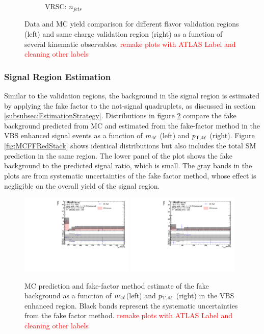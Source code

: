 \begin{figure}[htb]
\begin{subfigure}{.48\textwidth}
        \caption{VRSC: $n_{jets}$}
    \end{subfigure}
        \caption{ Data and MC yield comparison for different flavor validation regions (left) and same charge validation region (right) as a function of several kinematic observables. \textcolor{red}{remake plots with ATLAS Label and cleaning other labels} \label{fig:AllDataMCYield}}
\end{figure}

\subsubsection{Signal Region Estimation}
\label{subsubsec:SREstimation}
Similar to the validation regions, the background in the signal region is estimated by applying the fake factor to the not-signal quadruplets, as discussed in section \ref{subsubsec:EstimationStrategy}. Distributions in figure \ref{fig:MCFFRedComparison} compare the fake background predicted from MC and estimated from the fake-factor method in the VBS enhanced signal events as a function of $m_{4\ell}$ (left) and $p_{\textrm{T} ,4\ell}$ (right). Figure \ref{fig:MCFFRedStack} shows identical distributions but also includes the total SM prediction in the same region. The lower panel of the plot shows the fake background to the predicted signal ratio, which is small. The gray bands in the plots are from systematic uncertainties of the fake factor method, whose effect is negligible on the overall yield of the signal region.

\begin{figure}[htb]
    \centering
    \includegraphics[width=0.48\textwidth]{figures/Analysis/Background/MCRedCompare_VBS_Enhanced_M4l.pdf}
    \includegraphics[width=0.48\textwidth]{figures/Analysis/Background/MCRedCompare_VBS_Enhanced_Pt4l.pdf}
    \caption{ MC prediction and fake-factor method estimate of the fake background as a function of $m_{4\ell}$(left) and $p_{\textrm{T} ,4\ell}$ (right) in the VBS enhanced region. Black bands represent the systematic uncertainties from the fake factor method. \textcolor{red}{remake plots with ATLAS Label and cleaning other labels} \label{fig:MCFFRedComparison}}
\end{figure}

